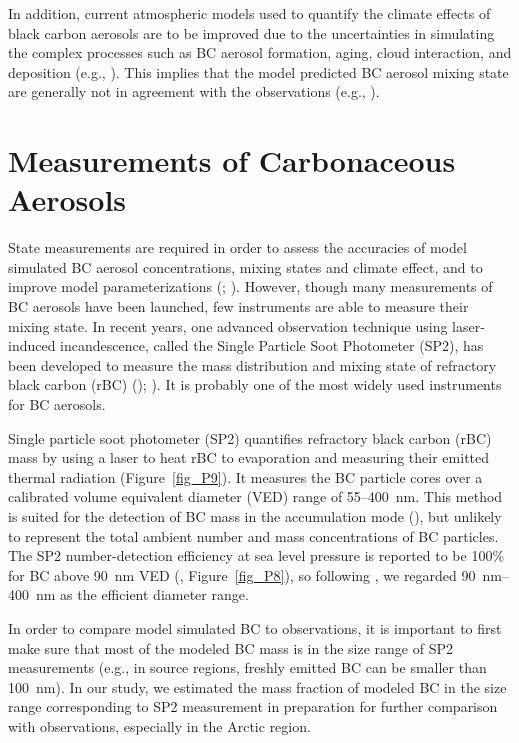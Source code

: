 \documentclass[12pt, fullpage]{uiucthesis2009}
\begin{document}
	In addition, current atmospheric models used to quantify the climate effects of black carbon aerosols are to be improved due to the uncertainties in simulating the complex processes such as BC aerosol formation, aging, cloud interaction, and deposition (e.g., \cite{Kipling2016}). This implies that the model predicted BC aerosol mixing state are generally not in agreement with the observations (e.g., \cite{Raatikainen2015}). 
	
	\section{Measurements of Carbonaceous Aerosols}
	State measurements are required in order to assess the accuracies of model simulated BC aerosol concentrations, mixing states and climate effect, and to improve model parameterizations (\cite{Reddington2013}; \cite{Reddington2013}). However, though many measurements of BC aerosols have been launched, few instruments are able to measure their mixing state. In recent years, one advanced observation technique using laser-induced incandescence, called the Single Particle Soot Photometer (SP2), has been developed to measure the mass distribution and mixing state of refractory black carbon (rBC) (\cite{baumgardner2004warming}); \cite{schulz2006radiative}). It is probably one of the most widely used instruments for BC aerosols. 
	
	Single particle soot photometer (SP2) quantifies refractory black carbon (rBC) mass by using a laser to heat rBC to evaporation and measuring their emitted thermal radiation (Figure~\ref{fig_P9}). It measures the BC particle cores over a calibrated volume equivalent diameter (VED) range of 55--400~nm. This method is suited for the detection of BC mass in the accumulation mode (\cite{schwarz2010global}), but unlikely to represent the total ambient number and mass concentrations of BC particles. The SP2 number-detection efficiency at sea level pressure is reported to be 100$\%$ for BC above 90~nm VED (\cite{schwarz2010global}, Figure~\ref{fig_P8}), so following \cite{Reddington2013}, we regarded 90~nm--400~nm as the efficient diameter range.
	
	In order to compare model simulated BC to observations, it is important to first make sure that most of the modeled BC mass is in the size range of SP2 measurements (e.g., in source regions, freshly emitted BC can be smaller than 100~nm). In our study, we estimated the mass fraction of modeled BC in the size range corresponding to SP2 measurement in preparation for further comparison with observations, especially in the Arctic region.
	
\end{document}
